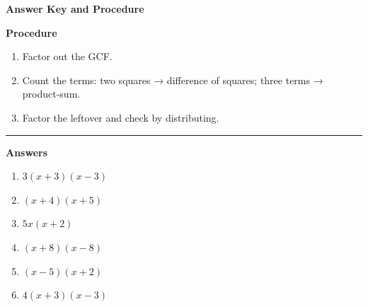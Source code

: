 \documentclass[12pt]{article}
\begin{document}
\begin{center}{\Large \textbf{Answer Key and Procedure}}\end{center}
\vspace{0.3cm}
\textbf{Procedure}
\begin{enumerate}
  \item Factor out the GCF.
  \item Count the terms: two squares → difference of squares; three terms → product-sum.
  \item Factor the leftover and check by distributing.
\end{enumerate}
\vspace{0.4cm}\hrule\vspace{0.4cm}
\textbf{Answers}
\begin{enumerate}[label=\textbf{\arabic*.}]
  \item $3(x+3)(x-3)$
  \item $(x+4)(x+5)$
  \item $5x(x+2)$
  \item $(x+8)(x-8)$
  \item $(x-5)(x+2)$
  \item $4(x+3)(x-3)$
\end{enumerate}
\end{document}
